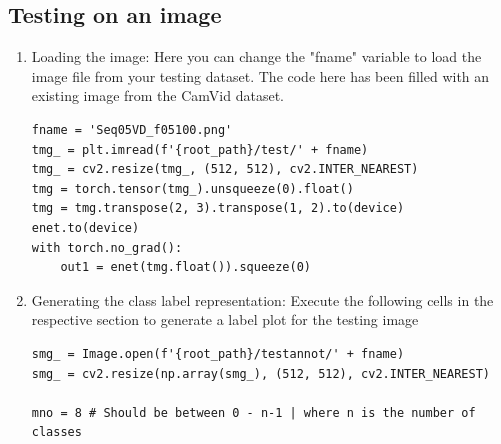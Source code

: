\subsection*{Testing on an image}
\begin{enumerate}
	\item Loading the image: Here you can change the "fname" variable to load the image file from your testing dataset. The code here has been filled with an existing image from the CamVid dataset.
	      \begin{lstlisting}
fname = 'Seq05VD_f05100.png'
tmg_ = plt.imread(f'{root_path}/test/' + fname)
tmg_ = cv2.resize(tmg_, (512, 512), cv2.INTER_NEAREST)
tmg = torch.tensor(tmg_).unsqueeze(0).float()
tmg = tmg.transpose(2, 3).transpose(1, 2).to(device)
enet.to(device)
with torch.no_grad():
    out1 = enet(tmg.float()).squeeze(0)
\end{lstlisting}
	\item Generating the class label representation: Execute the following cells in the respective section to generate a label plot for the testing image
	      \begin{lstlisting}
smg_ = Image.open(f'{root_path}/testannot/' + fname)
smg_ = cv2.resize(np.array(smg_), (512, 512), cv2.INTER_NEAREST)

mno = 8 # Should be between 0 - n-1 | where n is the number of classes


\end{lstlisting}
\end{enumerate}
